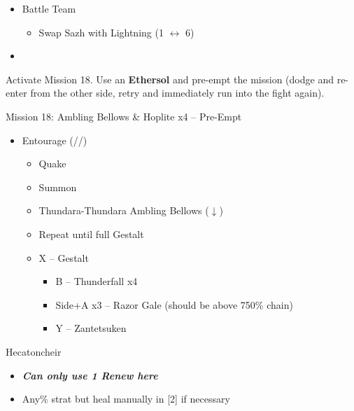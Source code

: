 \begin{menu}
	\begin{itemize}
		\paradigm
		\begin{itemize}
			\item Battle Team
				\begin{itemize}
					\item Swap Sazh with Lightning (1 $\leftrightarrow$ 6)
				\end{itemize}
			\item {}%
				  {\paradigmline[4]{(\rav)}{\med}{\sen}}%
			      {\paradigmline{\rav}{\rav}{\com}}%
			      {\paradigmline{\med}{\med}{\sen}}%
		\end{itemize}
	\end{itemize}
\end{menu}

\renewcommand{\first}{[1] Entourage (\rav/\med/\sen)}

Activate Mission 18.
Use an \textbf{Ethersol} and pre-empt the mission (dodge and re-enter from the other side, retry and immediately run into the fight again).

\begin{battle}{Mission 18: Ambling Bellows \& Hoplite x4 -- Pre-Empt}
	\begin{itemize}
		\item \first
			\begin{itemize}
				\item Quake
				\item Summon
				\item Thundara-Thundara Ambling Bellows ($\downarrow$)
				\item Repeat until full Gestalt
				\item X -- Gestalt
					\begin{itemize}
						\item B -- Thunderfall x4
						\item Side+A x3 -- Razor Gale (should be above 750\% chain)
						\item Y -- Zantetsuken
					\end{itemize}
			\end{itemize}
	\end{itemize}
\end{battle}

\begin{battle}{Hecatoncheir}
	\begin{itemize}
		\item \textit{\textbf{Can only use 1 Renew here}}
		\item Any\% strat but heal manually in [2] if necessary
	\end{itemize}
\end{battle}

